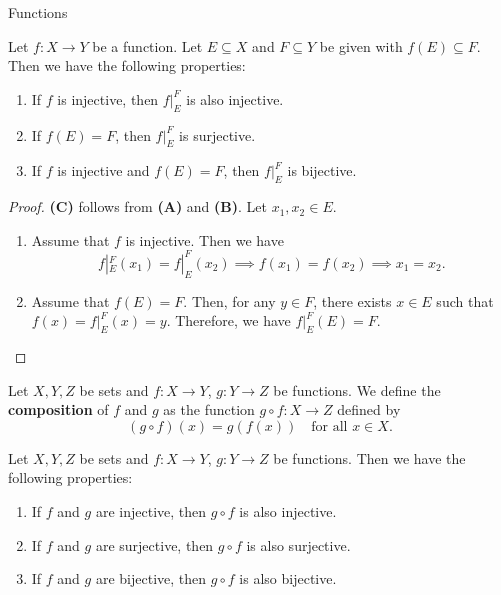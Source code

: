 \begin{section}{Functions}
\bigskip

\begin{theorem} \label{thm:PropertiesOfRestrictionFunctions}
    Let $f: X \to Y$ be a function. Let $E \subseteq X$ and $F \subseteq Y$ be given with $f(E) \subseteq F$.
    Then we have the following properties:
    \begin{enumerate}[label=\textbf{(\Alph*)}]
        \item If $f$ is injective, then $f|_{E}^{F}$ is also injective.
        \item If $f(E) = F$, then $f|_{E}^{F}$ is surjective.
        \item If $f$ is injective and $f(E) = F$, then $f|_{E}^{F}$ is bijective.
    \end{enumerate}
\end{theorem}

\begin{proof}
    \textbf{(C)} follows from \textbf{(A)} and \textbf{(B)}. Let $x_1, x_2 \in E$.
    \begin{enumerate}[label=\textbf{(\Alph*)}]
        \item Assume that $f$ is injective. Then we have
        \[
        f|_{E}^{F}(x_1) = f|_{E}^{F}(x_2) \implies f(x_1) = f(x_2) \implies x_1 = x_2.
        \]
        \item Assume that $f(E) = F$. Then, for any $y \in F$, there exists $x \in E$ such that
        $f(x) = f|_{E}^{F}(x) = y$. Therefore, we have $f|_{E}^{F}(E) = F$.
    \end{enumerate}
\end{proof}

\bigskip

\begin{definition} \label{def:CompositionFunction}
    Let $X, Y, Z$ be sets and $f: X \to Y$, $g: Y \to Z$ be functions. We define the
    \textbf{composition} of $f$ and $g$ as the function $g \circ f: X \to Z$ defined by
    \[
    (g \circ f)(x) = g(f(x)) \quad \text{for all } x \in X.
    \]
\end{definition}

\bigskip

\begin{theorem} \label{thm:PropertiesOfCompositionFunctions}
    Let $X, Y, Z$ be sets and $f: X \to Y$, $g: Y \to Z$ be functions. Then we have the following properties:
    \begin{enumerate}[label=\textbf{(\Alph*)}]
        \item If $f$ and $g$ are injective, then $g \circ f$ is also injective.
        \item If $f$ and $g$ are surjective, then $g \circ f$ is also surjective.
        \item If $f$ and $g$ are bijective, then $g \circ f$ is also bijective.
    \end{enumerate}
\end{theorem}


\end{section}
